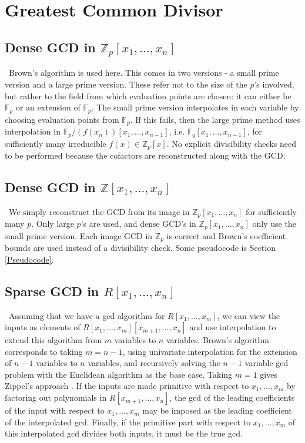 \documentclass[11pt,reqno]{amsart}
\numberwithin{equation}{section}
\newcommand{\bbZ}[0]  { \mathbb{Z}}
\newcommand{\bbF}[0]  { \mathbb{F}}
\begin{document}
\section{Greatest Common Divisor}

\subsection{Dense GCD in $\bbZ_p[x_1,\dots,x_n]$}\
Brown's algorithm \cite{Brown} is used here. This comes in two versions - a small prime version and a large prime version. These refer not to the size of the $p$'s involved, but rather to the field from which evaluation points are chosen: it can either be $\bbF_p$ or an extension of $\bbF_p$. The small prime version interpolates in each variable by choosing evaluation points from $\bbF_p$. If this fails, then the large prime method uses interpolation in $\bbF_p/(f(x_n))[x_1,\dots,x_{n-1}]$, i.e. $\bbF_q[x_1,\dots,x_{n-1}]$, for sufficiently many irreducible $f(x) \in \bbZ_p[x]$. No explicit divisibility checks need to be performed because the cofactors are reconstructed along with the GCD.

\subsection{Dense GCD in $\bbZ[x_1,\dots,x_n]$}\
We simply reconstruct the GCD from its image in $\bbZ_p[x_1,\dots,x_n]$ for sufficiently many $p$. Only large $p$'s are used, and dense GCD's in $\bbZ_p[x_1,\dots,x_n]$ only use the small prime version. Each image GCD in $\bbZ_p$ is correct and Brown's coefficient bounds \cite{Brown} are used instead of a divisibility check. Some pseudocode is Section \ref{Pseudocode}.

\subsection{Sparse GCD in $R[x_1,\dots,x_n]$}\
Assuming that we have a gcd algorithm for $R[x_1,\dots,x_m]$, we can view the inputs as elements of $R[x_1,\dots,x_m][x_{m+1},\dots,x_n]$ and use interpolation to extend this algorithm from $m$ variables to $n$ variables. Brown's algorithm corresponds to taking $m=n-1$, using univariate interpolation for the extension of $n-1$ variables to $n$ variables, and recursively solving the $n-1$ variable gcd problem with the Euclidean algorithm as the base case. Taking $m=1$ gives Zippel's approach \cite{ZIPPEL}.
If the inputs are made primitive with respect to $x_1,\dots,x_m$ by factoring out polynomials in $R[x_{m+1},\dots,x_n]$, the gcd of the leading coefficients of the input with respect to $x_1,\dots,x_m$ may be imposed as the leading coefficient of the interpolated gcd. Finally, if the primitive part with respect to $x_1,\dots,x_m$ of this interpolated gcd divides both inputs, it must be the true gcd.
\end{document}
